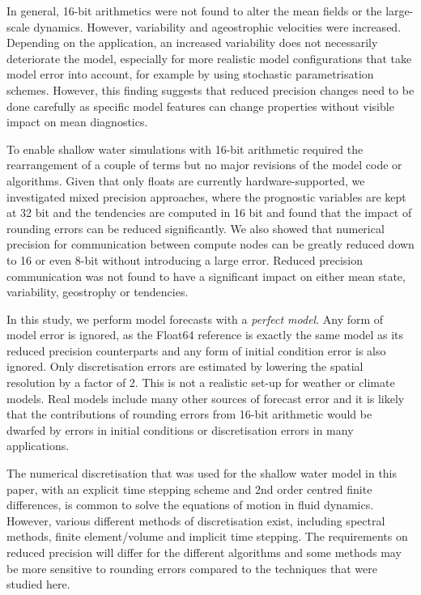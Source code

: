 \documentclass[draft]{agujournal2019}
\begin{document}
In general, 16-bit arithmetics were not found to alter the mean fields or the large-scale dynamics.
However, variability and ageostrophic velocities were increased. Depending on the application, an increased variability does not necessarily deteriorate the model, especially for more realistic model configurations that take model error into account, for example by using stochastic parametrisation schemes. However, this finding suggests that reduced precision changes need to be done carefully as specific model features can change properties without visible impact on mean diagnostics.

To enable shallow water simulations with 16-bit arithmetic required the rearrangement of a couple of terms but no major revisions of the model code or algorithms.
Given that only floats are currently hardware-supported, we investigated mixed precision approaches, where the prognostic variables are kept at 32 bit and the tendencies are computed in 16 bit and found that the impact of rounding errors can be reduced significantly.
We also showed that numerical precision for communication between compute nodes can be greatly reduced down to 16 or even 8-bit without introducing a large error.
Reduced precision communication was not found to have a significant impact on either mean state, variability, geostrophy or tendencies.

In this study, we perform model forecasts with a \emph{perfect model}.
Any form of model error is ignored, as the Float64 reference is exactly the same model as its reduced precision counterparts and any form of initial condition error is also ignored.
Only discretisation errors are estimated by lowering the spatial resolution by a factor of 2.
This is not a realistic set-up for weather or climate models.
Real models include many other sources of forecast error and it is likely that the contributions of rounding errors from 16-bit arithmetic would be dwarfed by errors in initial conditions or discretisation errors in many applications.

The numerical discretisation that was used for the shallow water model in this paper, with an explicit time stepping scheme and 2nd order centred finite differences, is common to solve the equations of motion in fluid dynamics.
However, various different methods of discretisation exist, including spectral methods, finite element/volume and implicit time stepping.
The requirements on reduced precision will differ for the different algorithms and some methods may be more sensitive to rounding errors compared to the techniques that were studied here.
\end{document}
